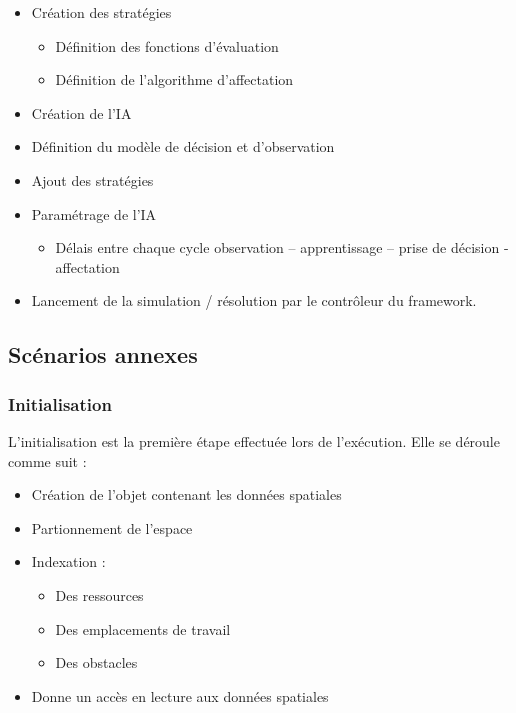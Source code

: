 \begin{itemize}
\item Création des stratégies
	\begin{itemize}
	\setlength{\itemsep}{2pt}
	\item Définition des fonctions d'évaluation
	\item Définition de l'algorithme d'affectation
	\end{itemize}
\item Création de l'IA
\item Définition du modèle de décision et d'observation
\item Ajout des stratégies
\item Paramétrage de l'IA
	\begin{itemize}
	\item Délais entre chaque cycle \og observation – apprentissage – prise de décision - affectation \fg
	\end{itemize}
\item Lancement de la simulation / résolution par le contrôleur du framework.
\end{itemize} %


\subsection{Scénarios annexes}

\subsubsection{Initialisation}

L'initialisation est la première étape effectuée lors de l'exécution. Elle se déroule comme suit :

	\begin{itemize}
	\setlength{\itemsep}{5pt}
	\item Création de l'objet contenant les données spatiales
	\item Partionnement de l'espace
	\item Indexation : %
		\begin{itemize}
		\item Des ressources
		\item Des emplacements de travail
		\item Des obstacles
		\end{itemize}
    \item Donne un accès en lecture aux données spatiales
	\end{itemize}

